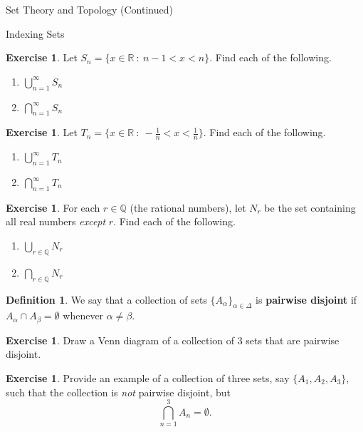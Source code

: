 \documentclass[11pt]{article}
\theoremstyle{definition}
\newtheorem{definition}[theorem]{Definition}
\newtheorem{exercise}[theorem]{Exercise}
\begin{document}
\begin{section}{Set Theory and Topology (Continued)}
\begin{subsection}{Indexing Sets}
\begin{exercise}
Let $S_n = \{x \in \mathbb{R} \ : \ n-1<x<n \}$.  Find each of the following.
\begin{enumerate}
\item $\displaystyle \bigcup_{n=1}^{\infty}S_n$

\item $\displaystyle \bigcap_{n=1}^{\infty}S_n$
\end{enumerate}
\end{exercise}

\begin{exercise}
Let $T_n = \{x \in \mathbb{R} \ : \ -\frac{1}{n}<x< \frac{1}{n} \}$.  Find each of the following.
\begin{enumerate}
\item $\displaystyle \bigcup_{n=1}^{\infty}T_n$

\item $\displaystyle \bigcap_{n=1}^{\infty}T_n$
\end{enumerate}

\end{exercise}

\begin{exercise}
For each $r\in\mathbb{Q}$ (the rational numbers), let $N_r$ be the set containing all real numbers \emph{except} $r$.  Find each of the following.
\begin{enumerate}
\item $\displaystyle \bigcup_{r\in\mathbb{Q}}N_r$

\item $\displaystyle \bigcap_{r\in\mathbb{Q}}N_r$
\end{enumerate}

\end{exercise}

\begin{definition}
We say that a collection of sets $\{A_{\alpha}\}_{\alpha\in\Delta}$ is \textbf{pairwise disjoint} if $A_{\alpha} \cap A_{\beta}=\emptyset$ whenever $\alpha\neq \beta$.
\end{definition}

\begin{exercise}
Draw a Venn diagram of a collection of 3 sets that are pairwise disjoint.
\end{exercise}

\begin{exercise}
Provide an example of a collection of three sets, say $\{A_1, A_2, A_3\}$, such that the collection is \emph{not} pairwise disjoint, but 
\[
\bigcap_{n=1}^3 A_n=\emptyset.
\]
\end{exercise}


\end{subsection}
\end{section}
\end{document}
